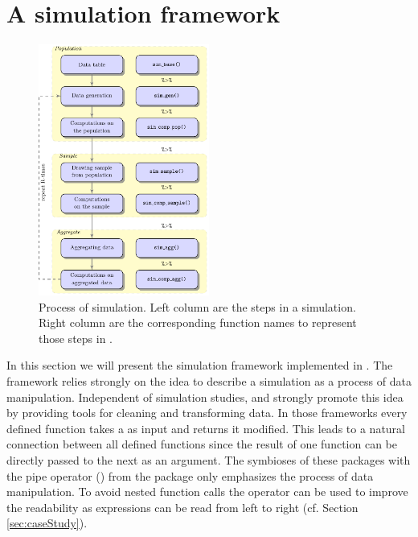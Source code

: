 \documentclass[article]{ajs}
\begin{document}
\section{A simulation framework}
\label{sec:framework}
%
\begin{figure}
\begin{center}
\includegraphics[width=0.5\textwidth]{flowdiagram}
\end{center}
\caption{\label{fig:flowdiagram}Process of simulation. Left column are the steps in a simulation. Right column are the corresponding function names to represent those steps in .} 
\end{figure}
%
In this section we will present the simulation framework implemented in . The framework relies strongly on the idea to describe a simulation as a process of data manipulation. Independent of simulation studies, \cite{wickham14a} and \cite{wickham14b} strongly promote this idea by providing tools for cleaning and transforming data. In those frameworks every defined function takes a  as input and returns it modified. This leads to a natural connection between all defined functions since the result of one function can be directly passed to the next as an argument. The symbioses of these packages with the pipe operator (\proglang{\%>\%}) from the package  \citep{bache14} only emphasizes the process of data manipulation. To avoid nested function calls the operator can be used to improve the readability as expressions can be read from left to right (cf. Section \ref{sec:caseStudy}).
\end{document}
